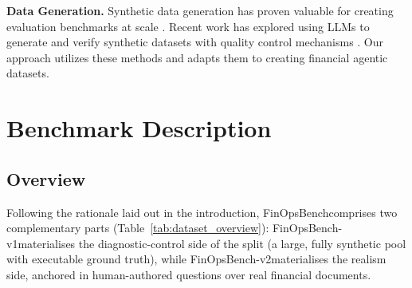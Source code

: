 \documentclass[11pt]{article}
\newcommand{\edit}[1]{\textcolor{blue}{#1}}
\newcommand{\editN}[1]{\textcolor{editgreen}{#1}}
\newcommand{\datasetname}{FinOpsBench}\xspace
\newcommand{\synthsubset}{FinOpsBench-v1}\xspace
\newcommand{\groundedfinqa}{FinOpsBench-v2}\xspace
\begin{document}
\noindent \textbf{Data Generation.}
Synthetic data generation has proven valuable for creating evaluation benchmarks at scale \citep{wang2022selfinstruct}. Recent work has explored using LLMs to generate and verify synthetic datasets with quality control mechanisms \citep{prabhakar2026apigen}. Our approach utilizes these methods and adapts them to creating financial agentic datasets.

\section{Benchmark Description}

\subsection{Overview}

\editN{Following the rationale laid out in the introduction, \datasetname comprises two complementary parts (Table~\ref{tab:dataset_overview}): \synthsubset materialises the diagnostic-control side of the split (a large, fully synthetic pool with executable ground truth), while \groundedfinqa materialises the realism side, anchored in human-authored questions over real financial documents.}
\end{document}
